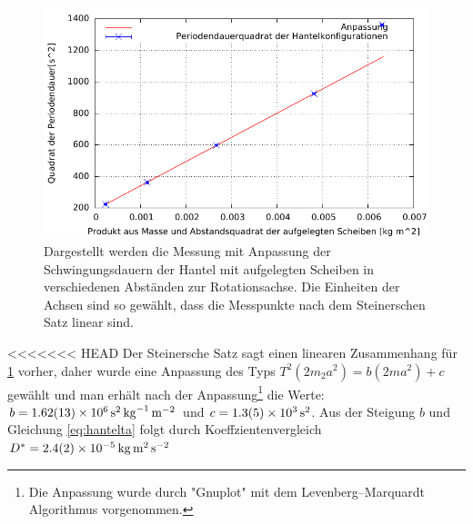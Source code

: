 \begin{figure}[h]
	\centering
	\includegraphics[width=0.7\linewidth]{auswertung/hantel/HantelF}
	\caption{Dargestellt werden die Messung mit Anpassung der Schwingungsdauern der Hantel mit aufgelegten Scheiben in verschiedenen Abständen zur Rotationsachse. Die Einheiten der Achsen sind so gewählt, dass die Messpunkte nach dem Steinerschen Satz linear sind.  }
	\label{fig:hantel}
\end{figure}

<<<<<<< HEAD
Der Steinersche Satz sagt einen linearen Zusammenhang für \cref{fig:hantel} vorher, daher wurde eine Anpassung des Typs $T^2(2m_2 a^2)=b (2m a^2)+c$ gewählt und man erhält nach der Anpassung\footnote{Die Anpassung wurde durch "Gnuplot" mit dem Levenberg–Marquardt Algorithmus vorgenommen.  } die Werte: $ b               = \SI{1.62   \pm 0.13 e+006}{\second \squared \per \kilogram \per \metre \squared} $ und $c               = \SI{ 1.3      +-0.5e3 }   {\second \squared}$. Aus der Steigung $b$ und Gleichung \ref{eq:hantelta} folgt durch Koeffzientenvergleich $D^*=\SI{2.4+-0.2e-5}{\kilogram \metre \squared \per \second \squared }$





